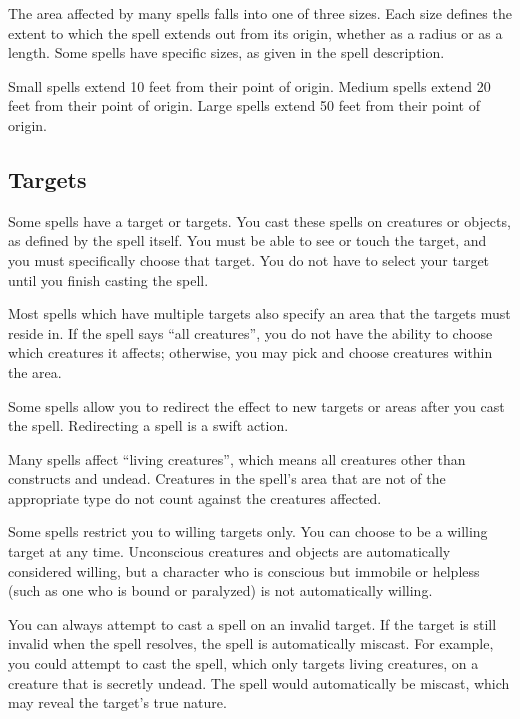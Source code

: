             The area affected by many spells falls into one of three sizes.
            Each size defines the extent to which the spell extends out from its origin, whether as a radius or as a length.
            Some spells have specific sizes, as given in the spell description.

             Small spells extend 10 feet from their point of origin.
             Medium spells extend 20 feet from their point of origin.
             Large spells extend 50 feet from their point of origin.

    \subsection{Targets}
        Some spells have a target or targets.
        You cast these spells on creatures or objects, as defined by the spell itself.
        You must be able to see or touch the target, and you must specifically choose that target.
        You do not have to select your target until you finish casting the spell.

         Most spells which have multiple targets also specify an area that the targets must reside in.
        If the spell says ``all creatures'', you do not have the ability to choose which creatures it affects; otherwise, you may pick and choose creatures within the area.

         Some spells allow you to redirect the effect to new targets or areas after you cast the spell.
        Redirecting a spell is a swift action.

         Many spells affect ``living creatures'', which means all creatures other than constructs and undead.
        Creatures in the spell's area that are not of the appropriate type do not count against the creatures affected.

         Some spells restrict you to willing targets only.
        You can choose to be a willing target at any time.
        Unconscious creatures and objects are automatically considered willing, but a character who is conscious but immobile or helpless (such as one who is bound or paralyzed) is not automatically willing.

         You can always attempt to cast a spell on an invalid target.
        If the target is still invalid when the spell resolves, the spell is automatically miscast.
        For example, you could attempt to cast the  spell, which only targets living creatures, on a creature that is secretly undead.
        The spell would automatically be miscast, which may reveal the target's true nature.

